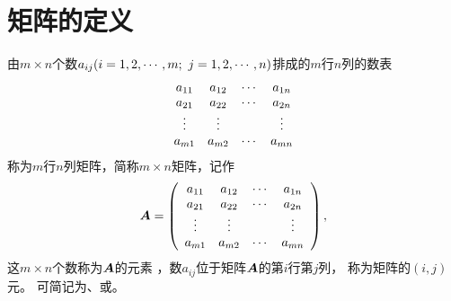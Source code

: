 \section{矩阵的定义}
\begin{dingyi}
  由$m\times n$个数$a_{ij}(i=1,2,\cdots,m; \ j = 1, 2, \cdots, n)$排成的$m$行$n$列的数表
  $$
  \begin{array}{cccc}
    a_{11} & a_{12} & \cdots & a_{1n}\\
    a_{21} & a_{22} & \cdots & a_{2n}\\
    \vdots    & \vdots   &     & \vdots \\
    a_{m1} & a_{m2} & \cdots & a_{mn}\\
  \end{array}
  $$
  称为$m$行$n$列矩阵，简称$m \times n$矩阵，记作
  $$
  {\boldsymbol{A}} = \left(
  \begin{array}{cccc}
    a_{11} & a_{12} & \cdots & a_{1n}\\
    a_{21} & a_{22} & \cdots & a_{2n}\\
    \vdots    & \vdots   &     & \vdots \\
    a_{m1} & a_{m2} & \cdots & a_{mn}\\
  \end{array}
  \right),
  $$
  这$m \times n$个数称为$\boldsymbol{A}$的元素
  ，数$a_{ij}$位于矩阵$\boldsymbol{A}$的第$i$行第$j$列，
  称为矩阵的$(i,j)$元。 可简记为、或。
\end{dingyi}

